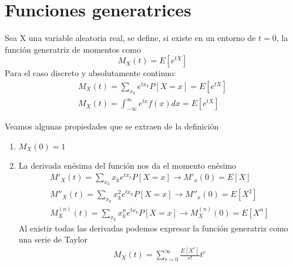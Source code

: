 \documentclass[PREyA.tex]{subfiles}
\begin{document}
\section{Funciones generatrices}

\begin{defi}Sea X una variable aleatoria real, se define, si existe en un entorno de $t=0$, la funci\'on generatriz de momentos como
\begin{equation*}
M_X(t)=E[e^{tX}]
\end{equation*}
Para el caso discreto y absolutamente continuo:
\begin{gather*}
M_X(t)=\sum_{x_k}e^{tx_k}P[X=x]=E[e^{tX}]\\
M_X(t)=\int_{-\infty}^\infty e^{tx}f(x)dx =E[e^{tX}]
\end{gather*}
\end{defi}
\begin{prop}Veamos algunas propiedades que se extraen de la definici\'on
\begin{enumerate}
\item $M_X(0)=1$
\item La derivada en\'esima del funci\'on nos da el momento en\'esimo
\begin{gather*}
M'_X(t)=\sum_{x_k}x_k e^{tx_k}P[X=x] \rightarrow M'_{x}(0)= E[X]\\
M''_X(t)=\sum_{x_k}x_k^2 e^{tx_k}P[X=x] \rightarrow M''_{x}(0)= E[X^2]\\
M^{(n)}_X(t)=\sum_{x_k}x_k^n e^{tx_k}P[X=x] \rightarrow M^{(n)}_{X}(0)= E[X^n]
\end{gather*}
Al existir todas las derivadas podemos expresar la funci\'on generatriz como una serie de Taylor
\begin{gather*}
M_X(t)=\sum_{r=0}^\infty \frac{E[X^r]}{r!}t^r
\end{gather*}
\end{enumerate}
\end{prop}
\end{document}
